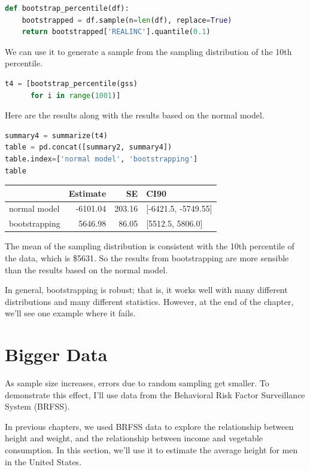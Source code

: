 \begin{lstlisting}[language=Python,style=source]
def bootstrap_percentile(df):
    bootstrapped = df.sample(n=len(df), replace=True)
    return bootstrapped['REALINC'].quantile(0.1)
\end{lstlisting}

We can use it to generate a sample from the sampling distribution of the
10th percentile.

\begin{lstlisting}[language=Python,style=source]
t4 = [bootstrap_percentile(gss)
      for i in range(1001)]
\end{lstlisting}

Here are the results along with the results based on the normal model.

\begin{lstlisting}[language=Python,style=source]
summary4 = summarize(t4)
table = pd.concat([summary2, summary4])
table.index=['normal model', 'bootstrapping']
table
\end{lstlisting}

\begin{tabular}{lrrl}
\toprule
{} &  Estimate &      SE &                 CI90 \\
\midrule
normal model  &  -6101.04 &  203.16 &  [-6421.5, -5749.55] \\
bootstrapping &   5646.98 &   86.05 &     [5512.5, 5806.0] \\
\bottomrule
\end{tabular}

The mean of the sampling distribution is consistent with the 10th
percentile of the data, which is \$5631. So the results from
bootstrapping are more sensible than the results based on the normal
model.

In general, bootstrapping is robust; that is, it works well with many
different distributions and many different statistics. However, at the
end of the chapter, we'll see one example where it fails.

\hypertarget{bigger-data}{%
\section{Bigger Data}\label{bigger-data}}

As sample size increases, errors due to random sampling get smaller. To
demonstrate this effect, I'll use data from the Behavioral Risk Factor
Surveillance System (BRFSS).

In previous chapters, we used BRFSS data to explore the relationship
between height and weight, and the relationship between income and
vegetable consumption. In this section, we'll use it to estimate the
average height for men in the United States.

